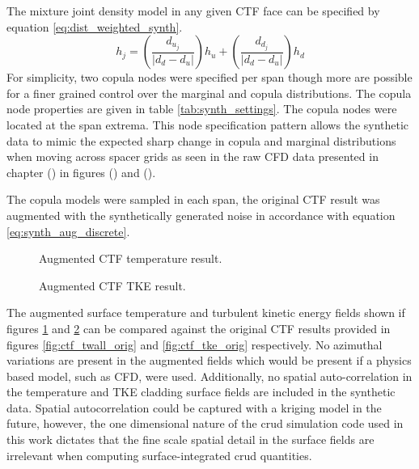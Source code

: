 The mixture joint density model in any given CTF face can be specified by equation \ref{eq:dist_weighted_synth}.
\begin{equation}
    h_j = \left( \frac{d_{u_j}}{|d_{d} - d_{u}|} \right) h_u +
    \left( \frac{d_{d_j}}{|d_{d} - d_{u}|} \right) h_d
    \label{eq:dist_weighted_synth}
\end{equation}
For simplicity, two copula nodes were specified per span though more are possible for a finer grained control over the marginal and copula distributions.  The copula node properties are given in table \ref{tab:synth_settings}.  The copula nodes were located at the span extrema. This node specification pattern allows the synthetic data to mimic the expected sharp change in copula and marginal distributions when moving across spacer grids as seen in the raw CFD data presented in chapter () in figures () and ().

The copula models were sampled in each span, the original CTF result was augmented with the synthetically generated noise in accordance with equation \ref{eq:synth_aug_discrete}.

\begin{figure}[H]%
    \centering
    \qquad
    \caption[Augmented CFD result.]{Augmented CTF temperature result.}%
    \label{fig:ctf_twall_aug}%
\end{figure}

\begin{figure}[H]%
    \centering
    \qquad
    \caption[Augmented CFD TKE result.]{Augmented CTF TKE result.}%
    \label{fig:ctf_tke_aug}%
\end{figure}

The augmented surface temperature and turbulent kinetic energy fields shown if figures \ref{fig:ctf_twall_aug} and \ref{fig:ctf_tke_aug} can be compared against the original CTF results provided in figures \ref{fig:ctf_twall_orig} and \ref{fig:ctf_tke_orig} respectively.  No azimuthal variations are present in the augmented fields which would be present if a physics based model, such as CFD, were used.  Additionally, no spatial auto-correlation in the temperature and TKE cladding surface fields are included in the synthetic data.  Spatial autocorrelation could be captured with a kriging model in the future, however, the one dimensional nature of the crud simulation code used in this work dictates that the fine scale spatial detail in the surface fields are irrelevant when computing surface-integrated crud quantities.


